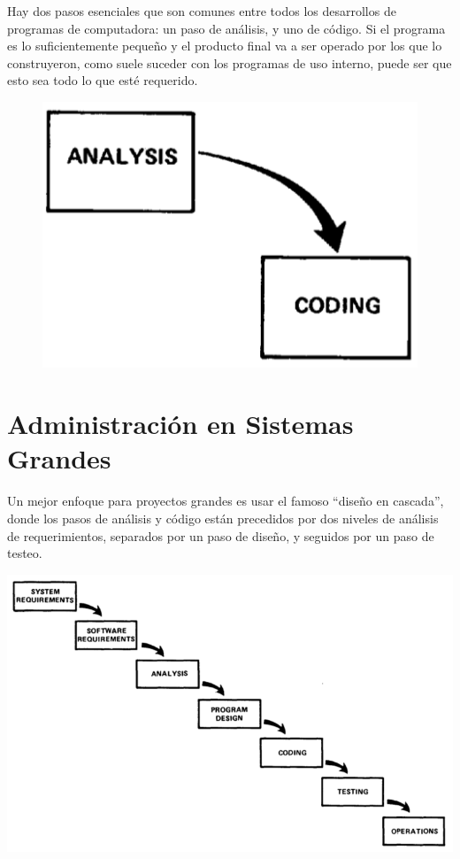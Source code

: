 \documentclass{beamer}
\begin{document}
\begin{frame}[fragile]
Hay dos pasos esenciales que son comunes entre todos los desarrollos de programas de computadora: un paso de análisis, y uno de código. Si el programa es lo suficientemente pequeño y el producto final va a ser operado por los que lo construyeron, como suele suceder con los programas de uso interno, puede ser que esto sea todo lo que esté requerido.

\begin{figure}[h]
\includegraphics[width=.3\textwidth]{figures/small.png}
\end{figure}

\vspace{-1em}


\end{frame}

\section{Administración en Sistemas Grandes}

\begin{frame}[fragile]
Un mejor enfoque para proyectos grandes es usar el famoso ``diseño en cascada'', donde los pasos de análisis y código están precedidos por dos niveles de análisis de requerimientos, separados por un paso de diseño, y seguidos por un paso de testeo.

\begin{center}
\includegraphics[height=.7\textheight]{figures/large.png}
\end{center}

\end{frame}
\end{document}
